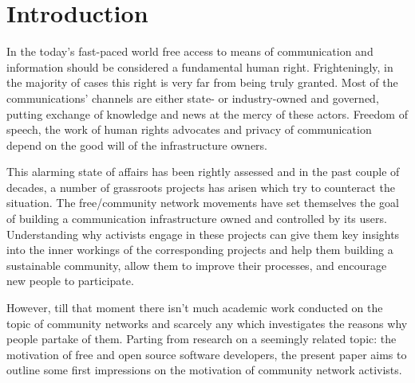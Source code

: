 \section{Introduction}

In the today's fast-paced world free access to means of communication and information should be considered a fundamental human right.
Frighteningly, in the majority of cases this right is very far from being truly granted.
Most of the communications' channels are either state- or industry-owned and governed, putting exchange of knowledge and news at the mercy of these actors.
Freedom of speech, the work of human rights advocates and privacy of communication depend on the good will of the infrastructure owners.

This alarming state of affairs has been rightly assessed and in the past couple of decades, a number of grassroots projects has arisen which try to counteract the situation.
The free/community network movements have set themselves the goal of building a communication infrastructure owned and controlled by its users.
Understanding why activists engage in these projects can give them key insights into the inner workings of the corresponding projects and help them building a sustainable community, allow them to improve their processes, and encourage new people to participate.

However, till that moment there isn't much academic work conducted on the topic of community networks and scarcely any which investigates the reasons why people partake of them.
Parting from research on a seemingly related topic: the motivation of free and open source software developers, the present paper aims to outline some first impressions on the motivation of community network activists.

\begin{comment}
* Untersuchungsgegenstand
* Erkenntnisinteresse
* Forschungsstand
* Ergebnisse können/sollen angedeuten werden

Why is the topic relevant??

* grassroots movements
* one of the free/open movements which is relatively understudied till now
* understanding why
  ** may enhance motivation and performance (or not);
  ** or give activists insights into how to improve their processes
\end{comment}


